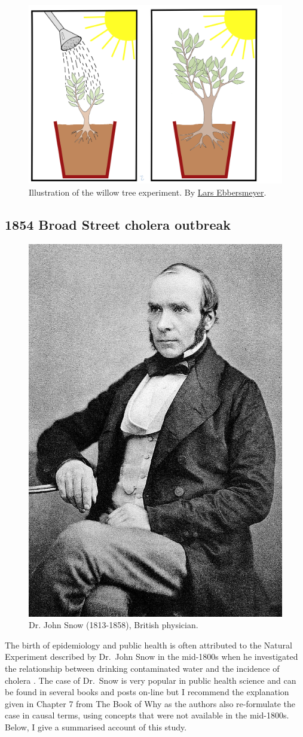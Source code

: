 \documentclass[
]{book}
\begin{document}
\begin{figure}[H]

{\centering \includegraphics[width=0.7\linewidth]{Figures/Van_Helmont_Experiment} 

}

\caption{Illustration of the willow tree experiment. By \href{https://commons.wikimedia.org/wiki/File:Van_Helmont_Experiment.jpg}{Lars Ebbersmeyer}.}\label{fig:van-helmont}
\end{figure}

\hypertarget{john-snow}{%
\subsection{1854 Broad Street cholera outbreak}\label{john-snow}}

\begin{figure}  
 \begin{center}
    \includegraphics[width=.22\textwidth]{Figures/John_Snow.jpg}  
  \captionsetup{labelformat=empty}
  \caption{Dr. John Snow (1813-1858), British physician.} 
\end{center}
\end{figure}
\addtocounter{figure}{-1}

The birth of epidemiology and public health is often attributed to the Natural Experiment described by Dr.~John Snow in the mid-1800s when he investigated the relationship between drinking contaminated water and the incidence of cholera \citep{applied_stats_healthcare}. The case of Dr.~Snow is very popular in public health science and can be found in several books and posts on-line but I recommend the explanation given in Chapter 7 from The Book of Why \citep{book-of-why} as the authors also re-formulate the case in causal terms, using concepts that were not available in the mid-1800s. Below, I give a summarised account of this study.
\end{document}

